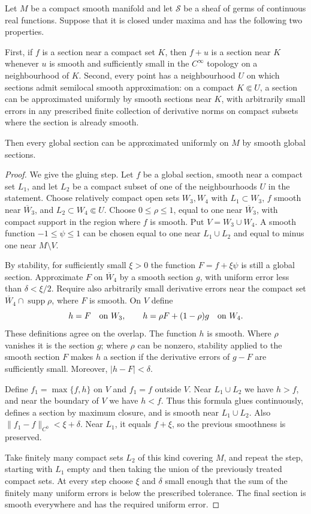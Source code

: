 \begin{lemma}\label{lem:compact-sheaf-regularization}
Let $M$ be a compact smooth manifold and let $\mathcal S$ be a sheaf of germs of continuous real functions. Suppose that it is closed under maxima and has the following two properties.

First, if $f$ is a section near a compact set $K$, then $f+u$ is a section near $K$ whenever $u$ is smooth and sufficiently small in the $C^\infty$ topology on a neighbourhood of $K$. Second, every point has a neighbourhood $U$ on which sections admit semilocal smooth approximation: on a compact $K\Subset U$, a section can be approximated uniformly by smooth sections near $K$, with arbitrarily small errors in any prescribed finite collection of derivative norms on compact subsets where the section is already smooth.

Then every global section can be approximated uniformly on $M$ by smooth global sections.
\end{lemma}
\begin{proof}
We give the gluing step. Let $f$ be a global section, smooth near a compact set $L_1$, and let $L_2$ be a compact subset of one of the neighbourhoods $U$ in the statement. Choose relatively compact open sets $W_3,W_4$ with $L_1\subset W_3$, $f$ smooth near $\overline W_3$, and $L_2\subset W_4\Subset U$. Choose $0\leq\rho\leq1$, equal to one near $\overline W_3$, with compact support in the region where $f$ is smooth. Put $V=W_3\cup W_4$. A smooth function $-1\leq\psi\leq1$ can be chosen equal to one near $L_1\cup L_2$ and equal to minus one near $M\setminus V$.

By stability, for sufficiently small $\xi>0$ the function $F=f+\xi\psi$ is still a global section. Approximate $F$ on $\overline W_4$ by a smooth section $g$, with uniform error less than $\delta<\xi/2$. Require also arbitrarily small derivative errors near the compact set $\overline W_4\cap\operatorname{supp}\rho$, where $F$ is smooth. On $V$ define
\[
 h=F\quad\hbox{on }W_3,\qquad
 h=\rho F+(1-\rho)g\quad\hbox{on }W_4.
\]
These definitions agree on the overlap. The function $h$ is smooth. Where $\rho$ vanishes it is the section $g$; where $\rho$ can be nonzero, stability applied to the smooth section $F$ makes $h$ a section if the derivative errors of $g-F$ are sufficiently small. Moreover, $|h-F|<\delta$.

Define $f_1=\max\{f,h\}$ on $V$ and $f_1=f$ outside $V$. Near $L_1\cup L_2$ we have $h>f$, and near the boundary of $V$ we have $h<f$. Thus this formula glues continuously, defines a section by maximum closure, and is smooth near $L_1\cup L_2$. Also $\|f_1-f\|_{C^0}<\xi+\delta$. Near $L_1$, it equals $f+\xi$, so the previous smoothness is preserved.

Take finitely many compact sets $L_2$ of this kind covering $M$, and repeat the step, starting with $L_1$ empty and then taking the union of the previously treated compact sets. At every step choose $\xi$ and $\delta$ small enough that the sum of the finitely many uniform errors is below the prescribed tolerance. The final section is smooth everywhere and has the required uniform error.
\end{proof}

